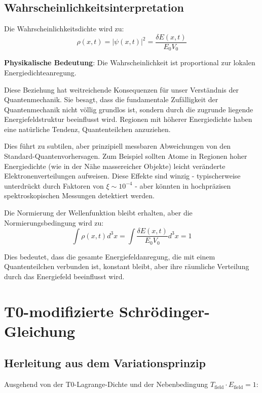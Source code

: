 \documentclass[12pt,a4paper]{article}
\newcommand{\deltaE}{\delta E}
\newcommand{\xipar}{\xi}
\theoremstyle{definition}
\theoremstyle{remark}
\begin{document}
\subsection{Wahrscheinlichkeitsinterpretation}

Die Wahrscheinlichkeitsdichte wird zu:
\begin{equation}
	\rho(x,t) = |\psi(x,t)|^2 = \frac{\deltaE(x,t)}{E_0 V_0}
	\label{eq:probability_density}
\end{equation}

\textbf{Physikalische Bedeutung}: Die Wahrscheinlichkeit ist proportional zur lokalen Energiedichteanregung.

Diese Beziehung hat weitreichende Konsequenzen f{\"u}r unser Verst{\"a}ndnis der Quantenmechanik. Sie besagt, dass die fundamentale Zuf{\"a}lligkeit der Quantenmechanik nicht v{\"o}llig grundlos ist, sondern durch die zugrunde liegende Energiefeldstruktur beeinflusst wird. Regionen mit h{\"o}herer Energiedichte haben eine nat{\"u}rliche Tendenz, Quantenteilchen anzuziehen.

Dies f{\"u}hrt zu subtilen, aber prinzipiell messbaren Abweichungen von den Standard-Quantenvorhersagen. Zum Beispiel sollten Atome in Regionen hoher Energiedichte (wie in der N{\"a}he massereicher Objekte) leicht ver{\"a}nderte Elektronenverteilungen aufweisen. Diese Effekte sind winzig - typischerweise unterdr{\"u}ckt durch Faktoren von $\xipar \sim 10^{-4}$ - aber k{\"o}nnten in hochpr{\"a}zisen spektroskopischen Messungen detektiert werden.

Die Normierung der Wellenfunktion bleibt erhalten, aber die Normierungsbedingung wird zu:
$$\int \rho(x,t) d^3x = \int \frac{\deltaE(x,t)}{E_0 V_0} d^3x = 1$$

Dies bedeutet, dass die gesamte Energiefeldanregung, die mit einem Quantenteilchen verbunden ist, konstant bleibt, aber ihre r{\"a}umliche Verteilung durch das Energiefeld beeinflusst wird.

\section{T0-modifizierte Schr{\"o}dinger-Gleichung}

\subsection{Herleitung aus dem Variationsprinzip}

Ausgehend von der T0-Lagrange-Dichte und der Nebenbedingung $T_{\text{field}} \cdot E_{\text{field}} = 1$:
\end{document}

